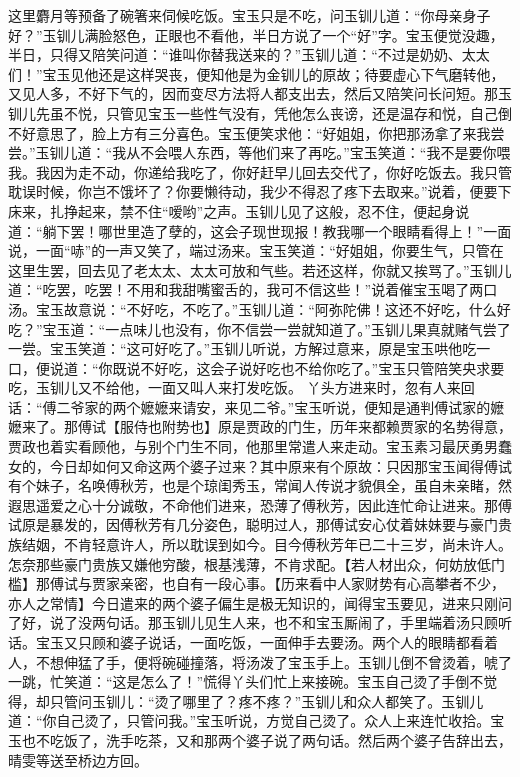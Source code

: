 \documentclass[12pt,oneside]{book}
\begin{document}
这里麝月等预备了碗箸来伺候吃饭。宝玉只是不吃，问玉钏儿道：“你母亲身子好？”玉钏儿满脸怒色，正眼也不看他，半日方说了一个“好”字。宝玉便觉没趣，半日，只得又陪笑问道：“谁叫你替我送来的？”玉钏儿道：“不过是奶奶、太太们！”宝玉见他还是这样哭丧，便知他是为金钏儿的原故；待要虚心下气磨转他，又见人多，不好下气的，因而变尽方法将人都支出去，然后又陪笑问长问短。那玉钏儿先虽不悦，只管见宝玉一些性气没有，凭他怎么丧谤，还是温存和悦，自己倒不好意思了，脸上方有三分喜色。宝玉便笑求他：“好姐姐，你把那汤拿了来我尝尝。”玉钏儿道：“我从不会喂人东西，等他们来了再吃。”宝玉笑道：“我不是要你喂我。我因为走不动，你递给我吃了，你好赶早儿回去交代了，你好吃饭去。我只管耽误时候，你岂不饿坏了？你要懒待动，我少不得忍了疼下去取来。”说着，便要下床来，扎挣起来，禁不住“嗳哟”之声。玉钏儿见了这般，忍不住，便起身说道：“躺下罢！哪世里造了孽的，这会子现世现报！教我哪一个眼睛看得上！”一面说，一面“哧”的一声又笑了，端过汤来。宝玉笑道：“好姐姐，你要生气，只管在这里生罢，回去见了老太太、太太可放和气些。若还这样，你就又挨骂了。”玉钏儿道：“吃罢，吃罢！不用和我甜嘴蜜舌的，我可不信这些！”说着催宝玉喝了两口汤。宝玉故意说：“不好吃，不吃了。”玉钏儿道：“阿弥陀佛！这还不好吃，什么好吃？”宝玉道：“一点味儿也没有，你不信尝一尝就知道了。”玉钏儿果真就赌气尝了一尝。宝玉笑道：“这可好吃了。”玉钏儿听说，方解过意来，原是宝玉哄他吃一口，便说道：“你既说不好吃，这会子说好吃也不给你吃了。”宝玉只管陪笑央求要吃，玉钏儿又不给他，一面又叫人来打发吃饭。
丫头方进来时，忽有人来回话：“傅二爷家的两个嬷嬷来请安，来见二爷。”宝玉听说，便知是通判傅试家的嬷嬷来了。那傅试【服侍也附势也】原是贾政的门生，历年来都赖贾家的名势得意，贾政也着实看顾他，与别个门生不同，他那里常遣人来走动。宝玉素习最厌勇男蠢女的，今日却如何又命这两个婆子过来？其中原来有个原故：只因那宝玉闻得傅试有个妹子，名唤傅秋芳，也是个琼闺秀玉，常闻人传说才貌俱全，虽自未亲睹，然遐思遥爱之心十分诚敬，不命他们进来，恐薄了傅秋芳，因此连忙命让进来。那傅试原是暴发的，因傅秋芳有几分姿色，聪明过人，那傅试安心仗着妹妹要与豪门贵族结姻，不肯轻意许人，所以耽误到如今。目今傅秋芳年已二十三岁，尚未许人。怎奈那些豪门贵族又嫌他穷酸，根基浅薄，不肯求配。【若人材出众，何妨放低门槛】那傅试与贾家亲密，也自有一段心事。【历来看中人家财势有心高攀者不少，亦人之常情】今日遣来的两个婆子偏生是极无知识的，闻得宝玉要见，进来只刚问了好，说了没两句话。那玉钏儿见生人来，也不和宝玉厮闹了，手里端着汤只顾听话。宝玉又只顾和婆子说话，一面吃饭，一面伸手去要汤。两个人的眼睛都看着人，不想伸猛了手，便将碗碰撞落，将汤泼了宝玉手上。玉钏儿倒不曾烫着，唬了一跳，忙笑道：“这是怎么了！”慌得丫头们忙上来接碗。宝玉自己烫了手倒不觉得，却只管问玉钏儿：“烫了哪里了？疼不疼？”玉钏儿和众人都笑了。玉钏儿道：“你自己烫了，只管问我。”宝玉听说，方觉自己烫了。众人上来连忙收拾。宝玉也不吃饭了，洗手吃茶，又和那两个婆子说了两句话。然后两个婆子告辞出去，晴雯等送至桥边方回。
\end{document}
